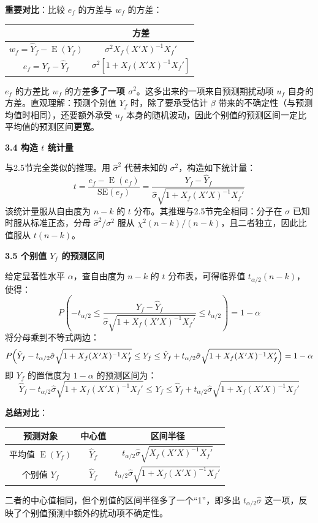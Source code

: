 \documentclass[12pt,a4paper]{ctexart}
\DeclareMathOperator{\E}{E}
\begin{document}
\textbf{重要对比}：比较 $e_f$ 的方差与 $w_f$ 的方差：

\begin{center}
\begin{tabular}{cc}
\toprule
 & \textbf{方差} \\
\midrule
$w_f = \hat{Y}_f - \E(Y_f)$ & $\sigma^2 X_f(X'X)^{-1}X_f'$ \\
$e_f = Y_f - \hat{Y}_f$ & $\sigma^2[1 + X_f(X'X)^{-1}X_f']$ \\
\bottomrule
\end{tabular}
\end{center}

$e_f$ 的方差比 $w_f$ 的方差\textbf{多了一项 $\sigma^2$}。这多出来的一项来自预测期扰动项 $u_f$ 自身的方差。直观理解：预测个别值 $Y_f$ 时，除了要承受估计 $\beta$ 带来的不确定性（与预测均值时相同），还要额外承受 $u_f$ 本身的随机波动，因此个别值的预测区间一定比平均值的预测区间\textbf{更宽}。

\textbf{3.4 构造 $t$ 统计量}

与2.5节完全类似的推理。用 $\hat{\sigma}^2$ 代替未知的 $\sigma^2$，构造如下统计量：
\begin{equation}
t = \frac{e_f - \E(e_f)}{\text{SE}(e_f)} = \frac{Y_f - \hat{Y}_f}{\hat{\sigma}\sqrt{1 + X_f(X'X)^{-1}X_f'}} \tag{3.65}
\end{equation}
该统计量服从自由度为 $n-k$ 的 $t$ 分布。其推理与2.5节完全相同：分子在 $\sigma$ 已知时服从标准正态，分母 $\hat{\sigma}^2/\sigma^2$ 服从 $\chi^2(n-k)/(n-k)$，且二者独立，因此比值服从 $t(n-k)$。

\textbf{3.5 个别值 $Y_f$ 的预测区间}

给定显著性水平 $\alpha$，查自由度为 $n-k$ 的 $t$ 分布表，可得临界值 $t_{\alpha/2}(n-k)$，使得：
\[
P\left(-t_{\alpha/2} \leq \frac{Y_f - \hat{Y}_f}{\hat{\sigma}\sqrt{1 + X_f(X'X)^{-1}X_f'}} \leq t_{\alpha/2}\right) = 1-\alpha
\]
将分母乘到不等式两边：
\[
P\Bigl(\hat{Y}_f - t_{\alpha/2}\hat{\sigma}\sqrt{1 + X_f(X'X)^{-1}X_f'} \leq Y_f \leq \hat{Y}_f + t_{\alpha/2}\hat{\sigma}\sqrt{1 + X_f(X'X)^{-1}X_f'}\Bigr) = 1-\alpha
\]
即 $Y_f$ 的置信度为 $1-\alpha$ 的预测区间为：
\begin{equation}
\hat{Y}_f - t_{\alpha/2}\hat{\sigma}\sqrt{1 + X_f(X'X)^{-1}X_f'} \leq Y_f \leq \hat{Y}_f + t_{\alpha/2}\hat{\sigma}\sqrt{1 + X_f(X'X)^{-1}X_f'} \tag{3.66}
\end{equation}

\vspace{1em}
\textbf{总结对比}：

\begin{center}
\begin{tabular}{ccc}
\toprule
\textbf{预测对象} & \textbf{中心值} & \textbf{区间半径} \\
\midrule
平均值 $\E(Y_f)$ & $\hat{Y}_f$ & $t_{\alpha/2}\hat{\sigma}\sqrt{X_f(X'X)^{-1}X_f'}$ \\
个别值 $Y_f$ & $\hat{Y}_f$ & $t_{\alpha/2}\hat{\sigma}\sqrt{1 + X_f(X'X)^{-1}X_f'}$ \\
\bottomrule
\end{tabular}
\end{center}

二者的中心值相同，但个别值的区间半径多了一个“1”，即多出 $t_{\alpha/2}\hat{\sigma}$ 这一项，反映了个别值预测中额外的扰动项不确定性。
\end{document}
